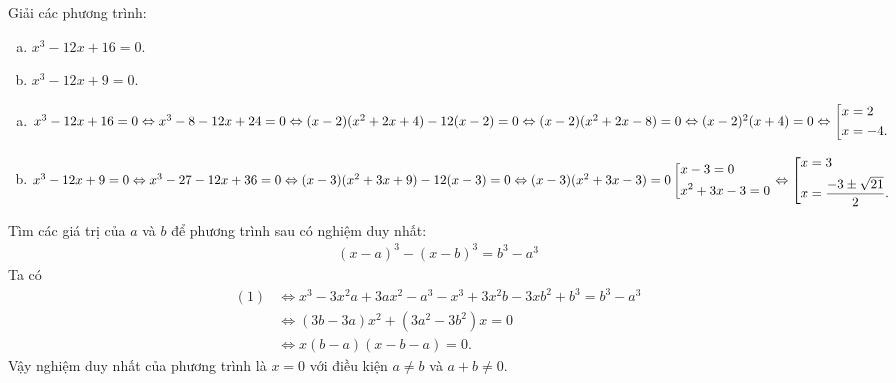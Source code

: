 \begin{vd}
	Giải các phương trình:
	\begin{multicols}{2}
		\begin{enumerate}[a)]
			\item $x^3 - 12x + 16 = 0$.
			\item $x^3-12x+9=0$.
		\end{enumerate}
	\end{multicols}
	\loigiai 
	{
		\begin{enumerate}[a)]
			\item $x^3 - 12x + 16 = 0 \Leftrightarrow x^3 -8-12x+24=0 \Leftrightarrow (x-2)(x^2 + 2x + 4) - 12(x-2) = 0 \Leftrightarrow (x-2)(x^2+2x-8) = 0 \Leftrightarrow (x-2)^2(x+4)=0 \Leftrightarrow \left[\begin{aligned}&x=2 \\ &x=-4.\end{aligned}\right.$
			\item $x^3-12x+9=0 \Leftrightarrow x^3-27-12x+36=0 \Leftrightarrow (x-3)(x^2+3x+9)-12(x-3)=0 \Leftrightarrow (x-3)(x^2+3x-3)=0 \left[\begin{aligned}&x-3=0 \\&x^2+3x-3=0\end{aligned}\right. \Leftrightarrow \left[\begin{aligned}&x=3 \\ &x=\dfrac{-3 \pm \sqrt{21}}{2}.\end{aligned}\right.$
		\end{enumerate}
	}
\end{vd}

\begin{vd}
	Tìm các giá trị của $a$ và $b$ để phương trình sau có nghiệm duy nhất:
	\begin{align*}
		(x-a)^3-(x-b)^3=b^3-a^3 \tag{1}
	\end{align*}
	\loigiai
	{
		Ta có
		\begin{align*}
			(1) &\Leftrightarrow x^3-3x^2a+3ax^2-a^3-x^3+3x^2b-3xb^2+b^3=b^3-a^3 \\
			&\Leftrightarrow (3b-3a)x^2+(3a^2-3b^2)x=0 \\
			&\Leftrightarrow x(b-a)(x-b-a)=0.
		\end{align*}
		Vậy nghiệm duy nhất của phương trình là $x=0$ với điều kiện $a \ne b$ và $a+b \ne 0$.
	}
\end{vd}

